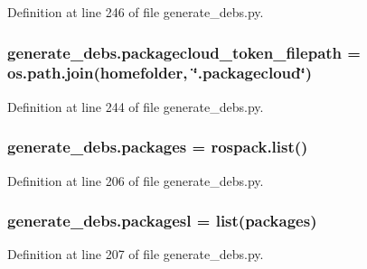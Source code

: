 Definition at line 246 of file generate\+\_\+debs.\+py.

\subsubsection[{\texorpdfstring{packagecloud\+\_\+token\+\_\+filepath}{packagecloud_token_filepath}}]{\setlength{\rightskip}{0pt plus 5cm}generate\+\_\+debs.\+packagecloud\+\_\+token\+\_\+filepath = os.\+path.\+join({\bf homefolder}, \char`\"{}.packagecloud\char`\"{})}\hypertarget{namespacegenerate__debs_a836a20b989c3c8e46255d91d10cb524f}{}\label{namespacegenerate__debs_a836a20b989c3c8e46255d91d10cb524f}


Definition at line 244 of file generate\+\_\+debs.\+py.

\subsubsection[{\texorpdfstring{packages}{packages}}]{\setlength{\rightskip}{0pt plus 5cm}generate\+\_\+debs.\+packages = rospack.\+list()}\hypertarget{namespacegenerate__debs_a40d4732827c5678f3f48354238245e1d}{}\label{namespacegenerate__debs_a40d4732827c5678f3f48354238245e1d}


Definition at line 206 of file generate\+\_\+debs.\+py.

\subsubsection[{\texorpdfstring{packagesl}{packagesl}}]{\setlength{\rightskip}{0pt plus 5cm}generate\+\_\+debs.\+packagesl = list({\bf packages})}\hypertarget{namespacegenerate__debs_acac340506bc1d8ca0d0881b9c00bfea2}{}\label{namespacegenerate__debs_acac340506bc1d8ca0d0881b9c00bfea2}


Definition at line 207 of file generate\+\_\+debs.\+py.

